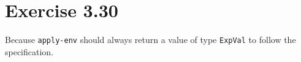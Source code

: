 \section*{Exercise 3.30}

Because \texttt{apply-env} should always return a value of type
\texttt{ExpVal} to follow the specification.
